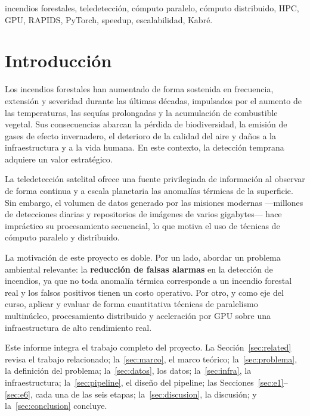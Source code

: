 \documentclass[conference]{IEEEtran}
\begin{document}
\begin{IEEEkeywords}
incendios forestales, teledetección, cómputo paralelo, cómputo distribuido, HPC, GPU, RAPIDS, PyTorch, speedup, escalabilidad, Kabré.
\end{IEEEkeywords}

\section{Introducción}
Los incendios forestales han aumentado de forma sostenida en frecuencia, extensión y severidad durante las últimas décadas, impulsados por el aumento de las temperaturas, las sequías prolongadas y la acumulación de combustible vegetal. Sus consecuencias abarcan la pérdida de biodiversidad, la emisión de gases de efecto invernadero, el deterioro de la calidad del aire y daños a la infraestructura y a la vida humana. En este contexto, la detección temprana adquiere un valor estratégico.

La teledetección satelital ofrece una fuente privilegiada de información al observar de forma continua y a escala planetaria las anomalías térmicas de la superficie. Sin embargo, el volumen de datos generado por las misiones modernas —millones de detecciones diarias y repositorios de imágenes de varios gigabytes— hace impráctico su procesamiento secuencial, lo que motiva el uso de técnicas de cómputo paralelo y distribuido.

La motivación de este proyecto es doble. Por un lado, abordar un problema ambiental relevante: la \textbf{reducción de falsas alarmas} en la detección de incendios, ya que no toda anomalía térmica corresponde a un incendio forestal real y los falsos positivos tienen un costo operativo. Por otro, y como eje del curso, aplicar y evaluar de forma cuantitativa técnicas de paralelismo multinúcleo, procesamiento distribuido y aceleración por GPU sobre una infraestructura de alto rendimiento real.

Este informe integra el trabajo completo del proyecto. La Sección~\ref{sec:related} revisa el trabajo relacionado; la~\ref{sec:marco}, el marco teórico; la~\ref{sec:problema}, la definición del problema; la~\ref{sec:datos}, los datos; la~\ref{sec:infra}, la infraestructura; la~\ref{sec:pipeline}, el diseño del pipeline; las Secciones~\ref{sec:e1}--\ref{sec:e6}, cada una de las seis etapas; la~\ref{sec:discusion}, la discusión; y la~\ref{sec:conclusion} concluye.

\end{document}
